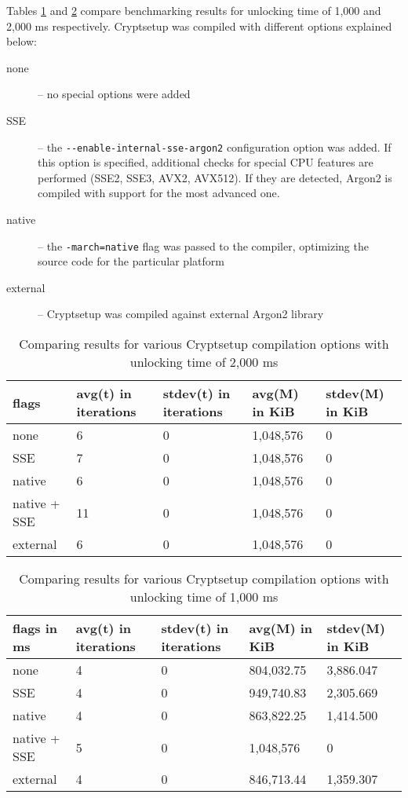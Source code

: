 \documentclass[nolof,digital]{fithesis3}
\begin{document}
\FloatBarrier

Tables \ref{tab:comp2000} and \ref{tab:comp1000} compare benchmarking results for unlocking time of 1,000 and 2,000 ms respectively. Cryptsetup was compiled with different options explained below:

\begin{description}
\item[none] -- no special options were added

\item[SSE] -- the \verb+--enable-internal-sse-argon2+ configuration option was added. If this option is specified, additional checks for special CPU features are performed (SSE2, SSE3, AVX2, AVX512). If they are detected, Argon2 is compiled with support for the most advanced one.

\item[native] -- the \verb+-march=native+ flag was passed to the compiler, optimizing the source code for the particular platform

\item[external] -- Cryptsetup was compiled against external Argon2 library
\end{description}

\noindent
\begin{table}
\caption{Comparing results for various Cryptsetup compilation options with unlocking time of 2,000 ms}
\label{tab:comp2000}
\begin{tabularx}{\textwidth}{| l | X | X | X | X |}
\hline
flags & avg(t)  in iterations & stdev(t) in iterations & avg(M) in KiB & stdev(M) in KiB\\
\hline
none & 6 & 0 & 1,048,576 & 0\\
\hline
SSE & 7 & 0 & 1,048,576 & 0\\
\hline
native & 6 & 0 & 1,048,576 & 0\\
\hline
native + SSE & 11 & 0 & 1,048,576 & 0\\
\hline
external & 6 & 0 & 1,048,576 & 0\\
\hline
\end{tabularx}
\end{table}

\noindent
\begin{table}
\caption{Comparing results for various Cryptsetup compilation options with unlocking time of 1,000 ms}
\label{tab:comp1000}
\begin{tabularx}{\textwidth}{| l | X | X | X | X |}
\hline
flags in ms & avg(t)  in iterations & stdev(t) in iterations & avg(M) in KiB & stdev(M) in KiB\\
\hline
none & 4 & 0 & 804,032.75 & 3,886.047\\
\hline
SSE & 4 & 0 & 949,740.83 & 2,305.669\\
\hline
native & 4 & 0 & 863,822.25 & 1,414.500\\
\hline
native + SSE & 5 & 0 & 1,048,576 & 0\\
\hline
external & 4 & 0 & 846,713.44 & 1,359.307\\
\hline
\end{tabularx}
\end{table}
\end{document}
